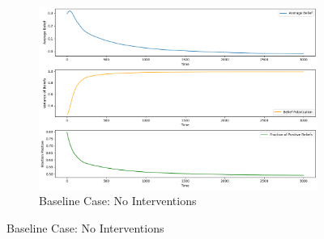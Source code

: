 \documentclass[a4paper,11pt]{scrartcl}
\begin{document}
\begin{figure}[H]
    \centering
    \begin{subfigure}[b]{0.45\textwidth}
        \centering
        \includegraphics[width=\textwidth]{./images/task4_1.png}
        \caption{Baseline Case: No Interventions}
        \label{fig:task4_1}
    \end{subfigure}
    
    \vspace{0.5cm} 


\end{figure}
\end{document}
